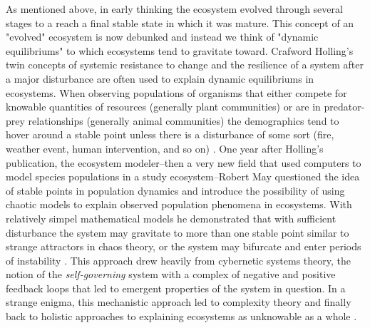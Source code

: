As mentioned above, in early thinking the ecosystem evolved through several stages to a reach a final stable state in which it was mature. This concept of an "evolved" ecosystem is now debunked and instead we think of "dynamic equilibriums" to which ecosystems tend to gravitate toward. Crafword Holling's twin concepts of systemic resistance to change and the resilience of a system after a major disturbance are often used to explain dynamic equilibriums in ecosystems. When observing populations of organisms that either compete for knowable quantities of resources (generally plant communities) or are in predator-prey relationships (generally animal communities) the demographics tend to hover around a stable point unless there is a disturbance of some sort (fire, weather event, human intervention, and so on) \cite{holling_1973}. One year after Holling's publication, the ecosystem modeler--then a very new field that used computers to model species populations in a study ecosystem--Robert May questioned the idea of stable points in population dynamics and introduce the possibility of using chaotic models to explain observed population phenomena in ecosystems. With relatively simpel mathematical models he demonstrated that with sufficient disturbance the system may gravitate to more than one stable point similar to strange attractors in chaos theory, or the system may bifurcate and enter periods of instability \cite{may_1974}. This approach drew heavily from cybernetic systems theory, the notion of the \textit{self-governing} system with a complex of negative and positive feedback loops that led to emergent properties of the system in question. In a strange enigma, this mechanistic approach led to complexity theory and finally back to holistic approaches to explaining ecosystems as unknowable as a whole \cite{barbour_1996}.

